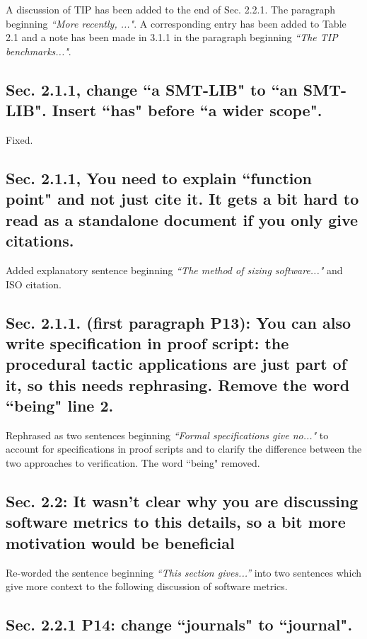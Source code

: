 \documentclass[]{article}
\begin{document}
A discussion of TIP has been added to the end of Sec. 2.2.1. The paragraph beginning \emph{``More recently, ..."}. A corresponding entry has been added to Table 2.1 and a note has been made in 3.1.1 in the paragraph beginning \emph{``The TIP benchmarks..."}.

\subsection{Sec. 2.1.1, change ``a SMT-LIB" to ``an SMT-LIB". Insert ``has" before ``a wider scope".}

Fixed.

\subsection{Sec. 2.1.1, You need to explain ``function point" and not just cite it. It gets a bit hard to read as a standalone document if you only give citations.}

Added explanatory sentence beginning \emph{``The method of sizing software..."} and ISO citation. 

\subsection{Sec. 2.1.1. (first paragraph P13): You can also write specification in proof script: the procedural tactic applications are just part of it, so this needs rephrasing. Remove the word ``being" line 2.} 

Rephrased as two sentences beginning \emph{``Formal specifications give no..."} to account for specifications in proof scripts and to clarify the difference between the two approaches to verification.
The word ``being" removed.
	
\subsection{Sec. 2.2: It wasn't clear why you are discussing software metrics to this details, so a bit more motivation would be beneficial}

Re-worded the sentence beginning \emph{``This section gives...''} into two sentences which give more context to the following discussion of software metrics. 


\subsection{Sec. 2.2.1 P14: change ``journals" to ``journal".}
\end{document}
